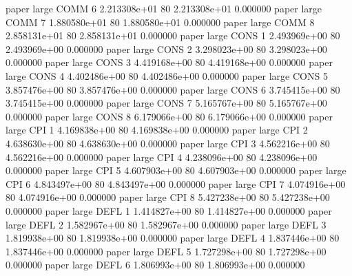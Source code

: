               paper      large     COMM                 6 2.213308e+01 80   2.213308e+01           0.000000
              paper      large     COMM                 7 1.880580e+01 80   1.880580e+01           0.000000
              paper      large     COMM                 8 2.858131e+01 80   2.858131e+01           0.000000
              paper      large     CONS                 1 2.493969e+00 80   2.493969e+00           0.000000
              paper      large     CONS                 2 3.298023e+00 80   3.298023e+00           0.000000
              paper      large     CONS                 3 4.419168e+00 80   4.419168e+00           0.000000
              paper      large     CONS                 4 4.402486e+00 80   4.402486e+00           0.000000
              paper      large     CONS                 5 3.857476e+00 80   3.857476e+00           0.000000
              paper      large     CONS                 6 3.745415e+00 80   3.745415e+00           0.000000
              paper      large     CONS                 7 5.165767e+00 80   5.165767e+00           0.000000
              paper      large     CONS                 8 6.179066e+00 80   6.179066e+00           0.000000
              paper      large      CPI                 1 4.169838e+00 80   4.169838e+00           0.000000
              paper      large      CPI                 2 4.638630e+00 80   4.638630e+00           0.000000
              paper      large      CPI                 3 4.562216e+00 80   4.562216e+00           0.000000
              paper      large      CPI                 4 4.238096e+00 80   4.238096e+00           0.000000
              paper      large      CPI                 5 4.607903e+00 80   4.607903e+00           0.000000
              paper      large      CPI                 6 4.843497e+00 80   4.843497e+00           0.000000
              paper      large      CPI                 7 4.074916e+00 80   4.074916e+00           0.000000
              paper      large      CPI                 8 5.427238e+00 80   5.427238e+00           0.000000
              paper      large     DEFL                 1 1.414827e+00 80   1.414827e+00           0.000000
              paper      large     DEFL                 2 1.582967e+00 80   1.582967e+00           0.000000
              paper      large     DEFL                 3 1.819938e+00 80   1.819938e+00           0.000000
              paper      large     DEFL                 4 1.837446e+00 80   1.837446e+00           0.000000
              paper      large     DEFL                 5 1.727298e+00 80   1.727298e+00           0.000000
              paper      large     DEFL                 6 1.806993e+00 80   1.806993e+00           0.000000
